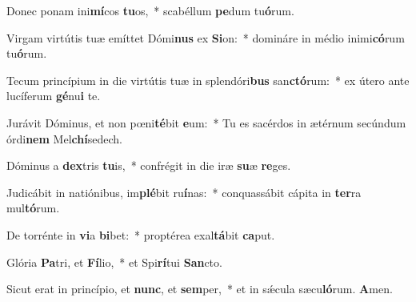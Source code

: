 \item Donec ponam ini\textbf{mí}cos \textbf{tu}os,~* scabéllum \textbf{pe}dum tu\textbf{ó}rum.
\item Virgam virtútis tuæ emíttet Dómi\textbf{nus} ex \textbf{Si}on:~* domináre in médio inimi\textbf{có}rum tu\textbf{ó}rum.
\item Tecum princípium in die virtútis tuæ in splendóri\textbf{bus} san\textbf{ctó}rum:~* ex útero ante lucíferum \textbf{gé}nu\textbf{i} te.
\item Jurávit Dóminus, et non pœni\textbf{té}bit \textbf{e}um:~* Tu es sacérdos in ætérnum secúndum órdi\textbf{nem} Mel\textbf{chí}sedech.
\item Dóminus a \textbf{dex}tris \textbf{tu}is,~* confrégit in die iræ \textbf{su}æ \textbf{re}ges.
\item Judicábit in natiónibus, im\textbf{plé}bit ru\textbf{í}nas:~* conquassábit cápita in \textbf{ter}ra mul\textbf{tó}rum.
\item De torrénte in \textbf{vi}a \textbf{bi}bet:~* proptérea exal\textbf{tá}bit \textbf{ca}put.
\item Glória \textbf{Pa}tri, et \textbf{Fí}lio,~* et Spi\textbf{rí}tui \textbf{San}cto.
\item Sicut erat in princípio, et \textbf{nunc}, et \textbf{sem}per,~* et in sǽcula sæcu\textbf{ló}rum. \textbf{A}men.
